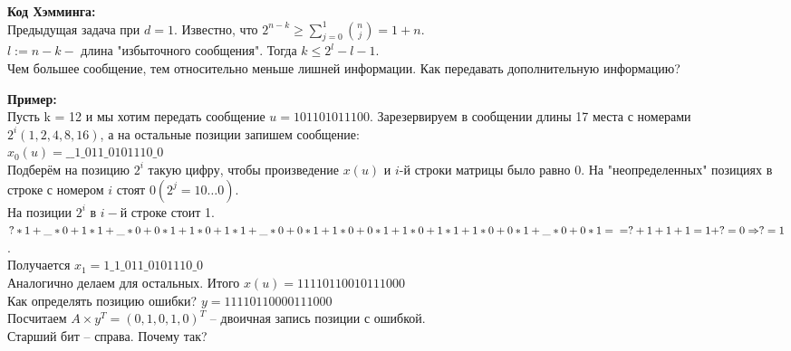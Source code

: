 	\textbf{Код Хэмминга:}\\
	Предыдущая задача при $d = 1$. Известно, что $\displaystyle 2^{n-k} \geqslant \sum_{j=0}^{1} \binom{n}{j} = 1+n$.\\
	$l := n - k -$ длина "избыточного сообщения". Тогда $k \leqslant 2^l - l - 1$.\\
	Чем большее сообщение, тем относительно меньше лишней информации. Как передавать дополнительную информацию?


	\textbf{Пример:}\\
	Пусть k = 12  и мы хотим передать сообщение $u = 101101011100$. Зарезервируем в сообщении длины 17 места с номерами $2^i (1, 2, 4, 8, 16)$, а на остальные позиции запишем сообщение:\\ $x_0 (u) = \_ \_ 1 \_ 011 \_ 0101110 \_ 0$\\
	Подберём на позицию $2^i$ такую цифру, чтобы произведение $x(u)$ и $i$-й строки матрицы было равно 0. На "неопределенных" позициях в строке с номером $i$ стоят $0 (2^j = 10 \dots 0)$.\\
	На позиции $2^i$ в $i-$й строке стоит 1.\\
	$?*1+\_*0+1*1+\_*0+0*1+1*0+1*1+\_*0+0*1+1*0+0*1+1*0+1*1+1*0+0*1+\_*0+0*1 = \\ = ? + 1 + 1 + 1 = 1 + ? = 0 \Rightarrow ? = 1$.\\
	Получается $x_1 = 1\_1\_011\_0101110\_0$\\
	Аналогично делаем для остальных. Итого $x(u) = 11110110010111000$\\
	Как определять позицию ошибки? $y = 11110110000111000$\\
	Посчитаем $A \times y^{T} = (0, 1, 0, 1, 0)^{T}$ -- двоичная запись позиции с ошибкой.\\
	Старший бит -- справа. Почему так? %


